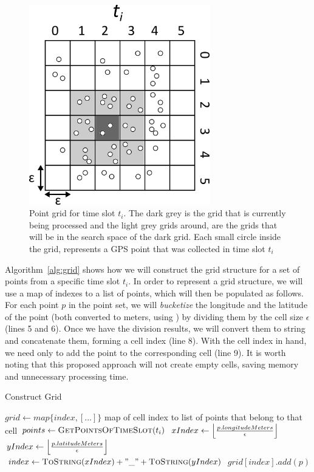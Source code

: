\begin{figure}[h!]
    \centering
    \includegraphics[width=0.7\textwidth]{images/grid.png}
    \caption{Point grid for time slot $t_i$. The dark grey is the grid that is currently being processed and the light
        grey grids around, are the grids that will be in the search space of the dark grid. Each small circle inside the
        grid, represents a GPS point that was collected in time slot $t_i$}
    \label{fig:grid}
\end{figure}

Algorithm~\ref{alg:grid} shows how we will construct the grid structure for a set of points from a specific time slot
$t_i$. In order to represent a grid structure, we will use a map of indexes to a list of points, which will then be
populated as follows. For each point $p$ in the point set, we will \textit{bucketize} the longitude and the latitude of
the point (both converted to meters, using ) by dividing them by the cell size $\epsilon$ (lines 5
and 6).  Once we have the division results, we will convert them to string and concatenate them, forming a cell index
(line 8).  With the cell index in hand, we need only to add the point to the corresponding cell (line 9). It is worth
noting that this proposed approach will not create empty cells, saving memory and unnecessary processing time.

\begin{algorithm}
\caption{Construct Grid}
\label{alg:grid}
\begin{algorithmic}[1]
    \State $grid \gets map\{index, [...]\}$ \Comment map of cell index to list of points that belong to that cell
    \State $points \gets \Call{GetPointsOfTimeSlot}{t_i}$
    \State
        \State $xIndex \gets \floor*{\frac{p.longitudeMeters}{\epsilon}}$
        \State $yIndex \gets \floor*{\frac{p.latitudeMeters}{\epsilon}}$
        \State
        \State $index \gets \Call{ToString}{xIndex} + "\_" + \Call{ToString}{yIndex}$
        \State $grid[index].add(p)$
    \EndFor
\end{algorithmic}
\end{algorithm}

